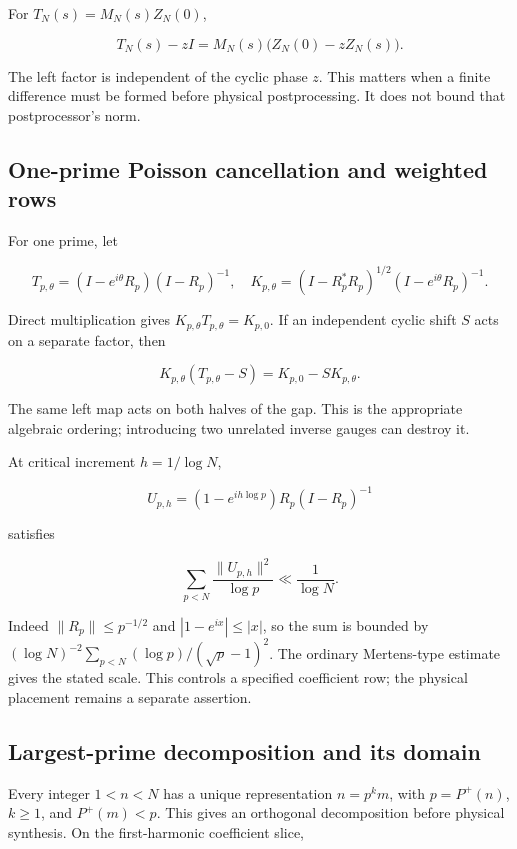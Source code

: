 \documentclass[
  10pt,
  a4paper,
  10pt,
  oneside,
  openany]{book}
\begin{document}
For \(T_N(s)=M_N(s)Z_N(0)\),

\[
T_N(s)-zI=M_N(s)\bigl(Z_N(0)-zZ_N(s)\bigr).
\tag{13.4}\label{eq:13.4}
\]

The left factor is independent of the cyclic phase \(z\). This matters
when a finite difference must be formed before physical postprocessing.
It does not bound that postprocessor's norm.

\subsection{One-prime Poisson cancellation and weighted
rows}\label{one-prime-poisson-cancellation-and-weighted-rows}

For one prime, let

\[
T_{p,\theta}=(I-e^{i\theta}R_p)(I-R_p)^{-1},
\quad
K_{p,\theta}=(I-R_p^*R_p)^{1/2}(I-e^{i\theta}R_p)^{-1}.
\tag{13.5}\label{eq:13.5}
\]

Direct multiplication gives \(K_{p,\theta}T_{p,\theta}=K_{p,0}\). If an
independent cyclic shift \(S\) acts on a separate factor, then

\[
K_{p,\theta}(T_{p,\theta}-S)=K_{p,0}-SK_{p,\theta}.
\tag{13.6}\label{eq:13.6}
\]

The same left map acts on both halves of the gap. This is the
appropriate algebraic ordering; introducing two unrelated inverse gauges
can destroy it.

At critical increment \(h=1/\log N\),

\[
U_{p,h}=(1-e^{ih\log p})R_p(I-R_p)^{-1}
\tag{13.7}\label{eq:13.7}
\]

satisfies

\[
\sum_{p<N}\frac{\|U_{p,h}\|^2}{\log p}
\ll\frac1{\log N}.
\tag{13.8}\label{eq:13.8}
\]

Indeed \(\|R_p\|\le p^{-1/2}\) and \(|1-e^{ix}|\le|x|\), so the sum is
bounded by \((\log N)^{-2}\sum_{p<N}(\log p)/(\sqrt p-1)^2\). The
ordinary Mertens-type estimate gives the stated scale. This controls a
specified coefficient row; the physical placement remains a separate
assertion.

\subsection{Largest-prime decomposition and its
domain}\label{largest-prime-decomposition-and-its-domain}

Every integer \(1<n<N\) has a unique representation \(n=p^km\), with
\(p=P^+(n)\), \(k\ge1\), and \(P^+(m)<p\). This gives an orthogonal
decomposition before physical synthesis. On the first-harmonic
coefficient slice,
\end{document}
